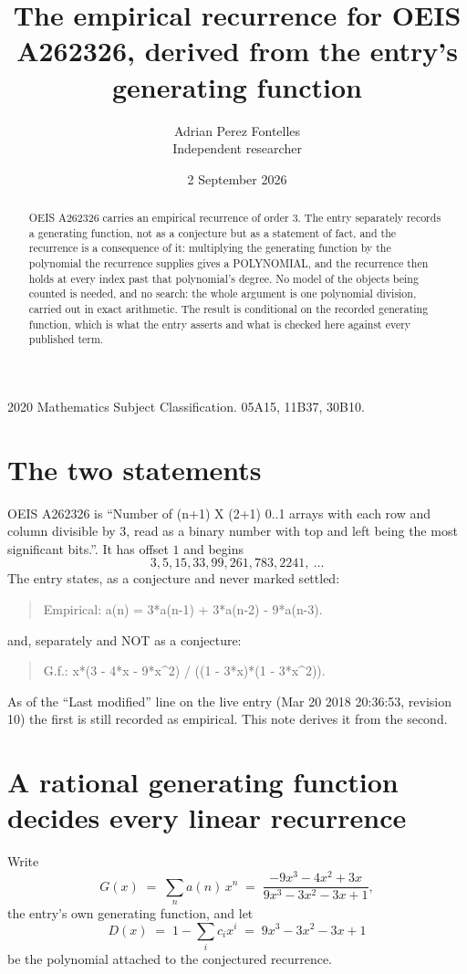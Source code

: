 \documentclass[11pt,a4paper]{article}
\title{The empirical recurrence for OEIS A262326, derived from the entry's generating function}
\author{Adrian Perez Fontelles\\ \small Independent researcher}
\date{2 September 2026}
\theoremstyle{plain}
\theoremstyle{definition}
\begin{document}
\maketitle

\begin{abstract}
OEIS A262326 carries an empirical recurrence of order $3$. The entry separately records a
generating function, not as a conjecture but as a statement of fact, and the recurrence is a
consequence of it: multiplying the generating function by the polynomial the recurrence
supplies gives a POLYNOMIAL, and the recurrence then holds at every index past that
polynomial's degree. No model of the objects being counted is needed, and no search: the
whole argument is one polynomial division, carried out in exact arithmetic. The result is
conditional on the recorded generating function, which is what the entry asserts and what is
checked here against every published term.
\end{abstract}

\noindent\small 2020 Mathematics Subject Classification. 05A15, 11B37, 30B10.\normalsize

\section{The two statements}

OEIS A262326 is ``Number of (n+1) X (2+1) 0..1 arrays with each row and column divisible by 3, read as a binary number with top and left being the most significant bits.''. It has offset $1$ and begins
\[
3, 5, 15, 33, 99, 261, 783, 2241,\ \dots
\]
The entry states, as a conjecture and never marked settled:
\begin{quote}
Empirical: a(n) = 3*a(n-1) + 3*a(n-2) - 9*a(n-3).
\end{quote}
and, separately and NOT as a conjecture:
\begin{quote}
G.f.: x*(3 - 4*x - 9*x\^{}2) / ((1 - 3*x)*(1 - 3*x\^{}2)).
\end{quote}
As of the ``Last modified'' line on the live entry (Mar 20 2018 20:36:53, revision 10) the first is still
recorded as empirical. This note derives it from the second.

\section{A rational generating function decides every linear recurrence}

Write
\[
G(x)\;=\;\sum_{n}a(n)\,x^{n}\;=\;\frac{- 9 x^{3} - 4 x^{2} + 3 x}{9 x^{3} - 3 x^{2} - 3 x + 1},
\]
the entry's own generating function, and let
\[
D(x)\;=\;1-\sum_i c_i x^{i}\;=\;9 x^{3} - 3 x^{2} - 3 x + 1
\]
be the polynomial attached to the conjectured recurrence.
\end{document}
